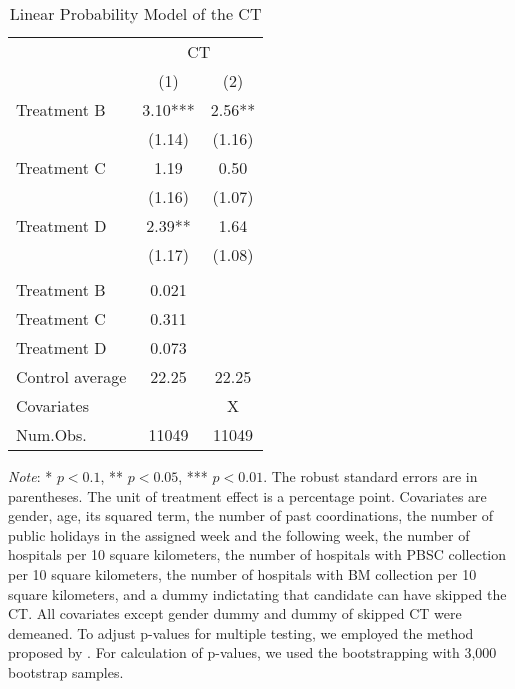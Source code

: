 \documentclass[12pt, a4paper]{article}
\begin{document}
\begin{table}

\caption{\label{tab:lm-test}Linear Probability Model of the CT}
\centering
\fontsize{8}{10}\selectfont
\begin{threeparttable}
\begin{tabular}[t]{>{\raggedright\arraybackslash}p{20em}cc}
\toprule
\multicolumn{1}{c}{ } & \multicolumn{2}{c}{CT} \\
\cmidrule(l{3pt}r{3pt}){2-3}
  & (1) & (2)\\
\midrule
Treatment B & \num{3.10}*** & \num{2.56}**\\
 & (\num{1.14}) & (\num{1.16})\\
Treatment C & \num{1.19} & \num{0.50}\\
 & (\num{1.16}) & (\num{1.07})\\
Treatment D & \num{2.39}** & \num{1.64}\\
 & (\num{1.17}) & (\num{1.08})\\
\midrule
\addlinespace[0.3em]
\multicolumn{3}{l}{\textit{Adjustment of p-values for Multiple Testing}}\\
\hspace{1em}Treatment B & 0.021 & \\
\hspace{1em}Treatment C & 0.311 & \\
\hspace{1em}Treatment D & 0.073 & \\
Control average & 22.25 & 22.25\\
Covariates &  & X\\
Num.Obs. & \num{11049} & \num{11049}\\
\bottomrule
\end{tabular}
\begin{tablenotes}
\item \emph{Note}: * $p < 0.1$, ** $p < 0.05$, *** $p < 0.01$. The robust standard errors are in parentheses. The unit of treatment effect is a percentage point. Covariates are gender, age, its squared term, the number of past coordinations, the number of public holidays in the assigned week and the following week, the number of hospitals per 10 square kilometers, the number of hospitals with PBSC collection per 10 square kilometers, the number of hospitals with BM collection per 10 square kilometers, and a dummy indictating that candidate can have skipped the CT. All covariates except gender dummy and dummy of skipped CT were demeaned. To adjust p-values for multiple testing, we employed the method proposed by \citet{List2019}. For calculation of p-values, we used the bootstrapping with 3,000 bootstrap samples.
\end{tablenotes}
\end{threeparttable}
\end{table}
\end{document}
